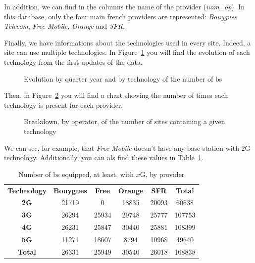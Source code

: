 \documentclass[lettersize,journal,english]{IEEEtran}
\begin{document}
In addition, we can find in the columns the name of the provider (\textsl{nom\_op}). In this database, only the four main french providers are represented:
\emph{Bouygues Telecom}, \emph{Free Mobile}, \emph{Orange} and \emph{SFR}.

Finally, we have informations about the technologies used in every site. Indeed, a site can use multiple technologies.
In Figure~\ref{fig:data_evolution} you will find the evolution of each technology from the first updates of the data.
\begin{figure}
    \centering
    \caption{Evolution by quarter year and by technology of the number of \acrshort{bs}}
    \label{fig:data_evolution}
\end{figure}
Then, in Figure~\ref{fig:data_technos} you will find a chart showing the number of times each technology is present for each provider.
\begin{figure}
    \centering
    \caption{Breakdown, by operator, of the number of sites containing a given technology}
    \label{fig:data_technos}
\end{figure}
We can see, for example, that \emph{Free Mobile} doesn't have any base station with $2$G technology. Additionally, you can als find these values in Table~\ref{table:techno_numbers}.
\begin{table}
    \centering
    \caption{Number of \acrfull{bs} equipped, at least, with $x$G, by provider}
    \label{table:techno_numbers}
    \begin{tabular}{cccccc}
        \toprule
        \textbf{Technology} & \textbf{Bouygues} & \textbf{Free} & \textbf{Orange} & \textbf{SFR} & \textbf{Total} \\
        \cmidrule(lr){1-6}
        \textbf{2G} & 21710 & 0 & 18835 & 20093 & 60638 \\
        \textbf{3G} & 26294 & 25934 & 29748 & 25777 & 107753 \\
        \textbf{4G} & 26231 & 25847 & 30440 & 25881 & 108399 \\
        \textbf{5G} & 11271 & 18607 & 8794 & 10968 & 49640 \\
        \textbf{Total} & 26331 & 25949 & 30540 & 26018 & 108838 \\
        \bottomrule
    \end{tabular}
\end{table}
\end{document}
